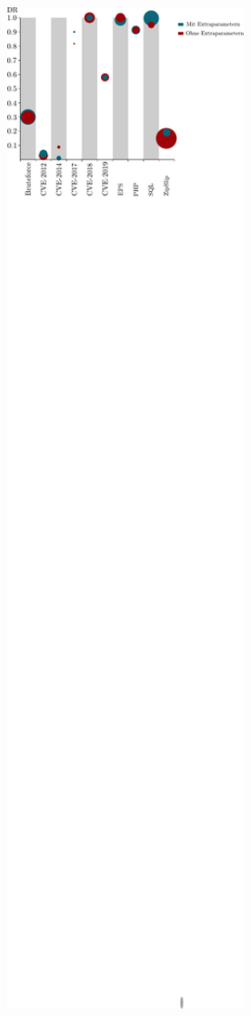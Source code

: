     \begin{figure}[H]
        \centering
        \includegraphics[width=1\textwidth]{images/Erg_balls.pdf}
        \caption[Visualisierung der Mittelwerte pro Szenario]{}\label{erg_vgl_extra}
    \end{figure}


